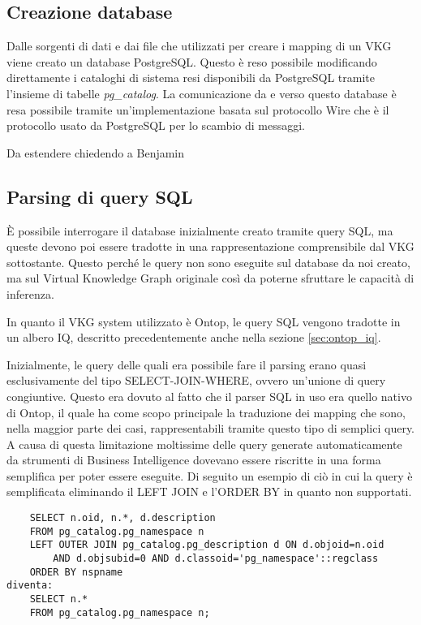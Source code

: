 \subsection{Creazione database}
\label{sec:bi-connector_db}
Dalle sorgenti di dati e dai file che utilizzati per creare i mapping di un VKG viene creato un database PostgreSQL.
Questo è reso possibile modificando direttamente i cataloghi di sistema resi disponibili da PostgreSQL tramite l'insieme di tabelle \textit{pg\_catalog}.
La comunicazione da e verso questo database è resa possibile tramite un'implementazione basata sul protocollo Wire che è il protocollo usato da PostgreSQL per lo scambio di messaggi.

Da estendere chiedendo a Benjamin

\subsection{Parsing di query SQL}
\label{sec:bi-connector_parsing}
\`E possibile interrogare il database inizialmente creato tramite query SQL, ma queste devono poi essere tradotte in una rappresentazione comprensibile dal VKG sottostante. Questo perché le query non sono eseguite sul database da noi creato, ma sul
Virtual Knowledge Graph originale così da poterne sfruttare le capacità di inferenza.

In quanto il VKG system utilizzato è Ontop, le query SQL vengono tradotte in un albero IQ, descritto precedentemente anche nella sezione \ref{sec:ontop_iq}. 

Inizialmente, le query delle quali era possibile fare il parsing erano quasi esclusivamente del tipo SELECT-JOIN-WHERE, ovvero un'unione di query congiuntive. Questo era dovuto al fatto che il parser SQL in uso era quello nativo di Ontop,
il quale ha come scopo principale la traduzione dei mapping che sono, nella maggior parte dei casi, rappresentabili tramite questo tipo di semplici query.
A causa di questa limitazione moltissime delle query generate automaticamente da strumenti di Business Intelligence dovevano essere riscritte in una forma semplifica per poter essere eseguite. 
Di seguito un esempio di ciò in cui la query è semplificata eliminando il LEFT JOIN e l'ORDER BY in quanto non supportati.
\begin{lstlisting}
    SELECT n.oid, n.*, d.description 
    FROM pg_catalog.pg_namespace n
    LEFT OUTER JOIN pg_catalog.pg_description d ON d.objoid=n.oid 
        AND d.objsubid=0 AND d.classoid='pg_namespace'::regclass
    ORDER BY nspname
diventa:
    SELECT n.* 
    FROM pg_catalog.pg_namespace n;
\end{lstlisting}

